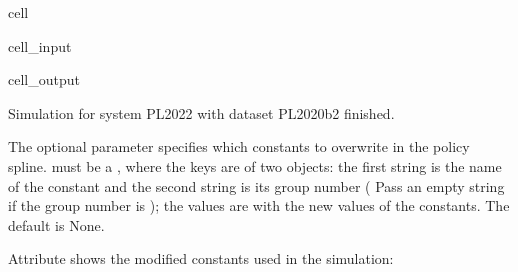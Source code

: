 \documentclass[letterpaper,10pt,english]{sphinxmanual}
\begin{document}
\begin{sphinxuseclass}{cell}
\begin{sphinxuseclass}{cell_input}
\begin{sphinxVerbatim}[commandchars=\\\{\}]
\PYG{p}{[}\PYG{p}{]}\PYG{p}{[}\PYG{p}{]}
\end{sphinxVerbatim}

\end{sphinxuseclass}
\begin{sphinxuseclass}{cell_output}
\begin{sphinxVerbatim}[commandchars=\\\{\}]
Simulation for system PL\PYGZus{}2022 with dataset PL\PYGZus{}2020\PYGZus{}b2 finished.
\end{sphinxVerbatim}

\end{sphinxuseclass}
\end{sphinxuseclass}
\sphinxAtStartPar
The optional parameter  specifies which constants to overwrite in the policy spline.  must be  a , where the keys are  of two  objects: the first string is the name of the constant and the second string is its group number ( Pass an empty string if the group number is ); the values are  with the new values of the constants. The default is None.

\sphinxAtStartPar
Attribute  shows the modified constants used in the simulation:
\end{document}

